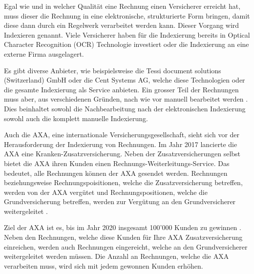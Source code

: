 \documentclass{hwz}
\begin{document}
Egal wie und in welcher Qualität eine Rechnung einen Versicherer erreicht hat, muss dieser die Rechnung in eine elektronische, strukturierte Form bringen, damit diese dann durch ein Regelwerk verarbeitet werden kann. Dieser Vorgang wird Indexieren genannt. Viele Versicherer haben für die Indexierung bereits in Optical Character Recognition (OCR) Technologie investiert oder die Indexierung an eine externe Firma ausgelagert. 

Es gibt diverse Anbieter, wie beispielsweise die Tessi document solutions (Switzerland) GmbH oder die Cent Systems AG, welche diese Technologien oder die gesamte Indexierung als Service anbieten. Ein grosser Teil der Rechnungen muss aber, aus verschiedenen Gründen, nach wie vor manuell bearbeitet werden . Dies beinhaltet sowohl die Nachbearbeitung nach der elektronischen Indexierung sowohl auch die komplett manuelle Indexierung. %


Auch die AXA, eine internationale Versicherungsgesellschaft, sieht sich vor der Herausforderung der Indexierung von Rechnungen. Im Jahr 2017 lancierte die AXA eine Kranken-Zusatzversicherung. Neben der Zusatzversicherungen selbst bietet die AXA ihren Kunden einen Rechnungs-Weiterleitungs-Service. Das bedeutet, alle Rechnungen können der AXA gesendet werden. Rechnungen beziehungsweise Rechnungspoisitionen, welche die Zusatzversicherung betreffen, werden von der AXA vergütet und Rechnungspositionen, welche die Grundversicherung betreffen, werden zur Vergütung an den Grundversicherer weitergeleitet \autocite{finanzen.ch2017AxaGewinnen}.

Ziel der AXA ist es, bis im Jahr 2020 insgesamt 100'000 Kunden zu gewinnen \autocite{finanzen.ch2017AxaGewinnen}. Neben den Rechnungen, welche diese Kunden für Ihre AXA Zusatzversicherung einreichen, werden auch Rechnungen eingereicht, welche an den Grundversicherer weitergeleitet werden müssen. Die Anzahl an Rechnungen, welche die AXA verarbeiten muss, wird sich mit jedem gewonnen Kunden erhöhen.
\end{document}

